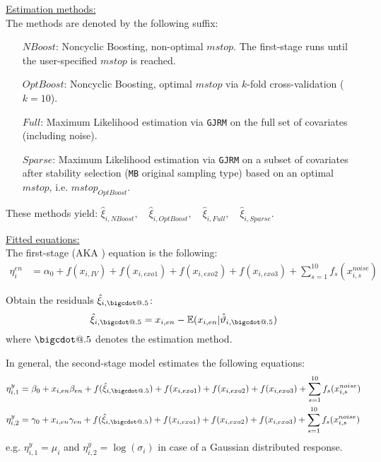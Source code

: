 \documentclass[12pt]{article}
\makeatletter
\newcommand*\bigcdot{\mathpalette\bigcdot@{.5}}
\newcommand*\bigcdot@[2]{\mathbin{\vcenter{\hbox{\scalebox{#2}{$\m@th#1\bullet$}}}}}
\makeatother
\begin{document}
\underline{Estimation methods:}\\
The methods are denoted by the following suffix: 
\begin{itemize}
\item[${NBoost}$:] Noncyclic Boosting, non-optimal $mstop$. The first-stage runs until the user-specified $mstop$ is reached.
\item[${OptBoost}$:] Noncyclic Boosting, optimal $mstop$ via $k$-fold cross-validation ($k=10$).
\item[${Full}$:] Maximum Likelihood estimation via \texttt{GJRM} on the full set of covariates (including noise).
\item[${Sparse}$:] Maximum Likelihood estimation via \texttt{GJRM} on a subset of covariates after stability selection (\texttt{MB} original sampling type) based on an optimal $mstop$, i.e. $mstop_{OptBoost}$.
\end{itemize}
These methods yield: $\hat{\xi}_{i,NBoost}, \quad \hat{\xi}_{i,OptBoost}, \quad \hat{\xi}_{i,Full}, \quad \hat{\xi}_{i,Sparse}$.

\underline{Fitted equations:} \\
The first-stage (AKA ) equation is the following: 
\begin{align*}
    \eta^{en}_{i} &= \alpha_0 + f(x_{i,IV}) + f(x_{i,exo1}) + f(x_{i,exo2}) + f(x_{i,exo3}) + \sum_{s = 1}^{10} f_s(x^{noise}_{i,s})
\end{align*}

Obtain the residuals $\hat{\xi}_{i,\bigcdot}$:
$$
\hat{\xi}_{i,\bigcdot} = x_{i,en} - \mathbb{E}(x_{i,en}|\hat{\vartheta}_{i,\bigcdot})
$$
where $\bigcdot$ denotes the estimation method.

In general, the second-stage model estimates the following equations: 
\begin{align*}
    \eta^{y}_{i,1} &= \beta_0 + x_{i,en}\beta_{en} + f(\hat{\xi}_{i,\bigcdot}) + f(x_{i,exo1}) + f(x_{i,exo2}) + f(x_{i,exo3}) + \sum_{s = 1}^{10} f_s(x^{noise}_{i,s}) \\
    \eta^{y}_{i,2} &= \gamma_0 + x_{i,en}\gamma_{en} + f(\hat{\xi}_{i,\bigcdot}) + f(x_{i,exo1}) + f(x_{i,exo2}) + f(x_{i,exo3}) + \sum_{s = 1}^{10} f_s(x^{noise}_{i,s}) \\
\end{align*}
e.g. $\eta^{y}_{i,1} = \mu_i$ and $\eta^{y}_{i,2} = \log(\sigma_i)$ in case of a Gaussian distributed response.
\end{document}
